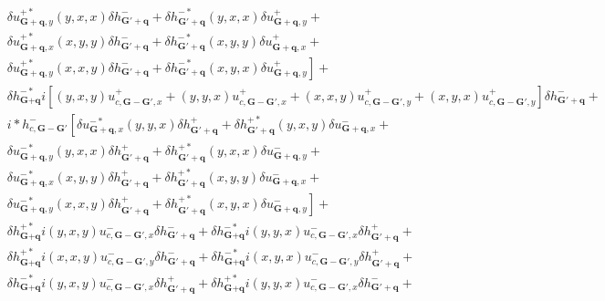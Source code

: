 \documentclass[aps,prx,10pt,twocolumn,superscriptaddress]{revtex4}
\begin{document}
\begin{widetext}
\begin{align}
&\delta u^{+*}_{\textbf{G}+\textbf{q},y}(y,x,x)\delta h^{-}_{\textbf{G}'+\textbf{q}} +\delta h^{-*}_{\textbf{G}'+\textbf{q}}(y,x,x)\delta u^{+}_{\textbf{G}+\textbf{q},y}+\nonumber\\
&\delta u^{+*}_{\textbf{G}+\textbf{q},x}(x,y,y)\delta h^{-}_{\textbf{G}'+\textbf{q}} +\delta h^{-*}_{\textbf{G}'+\textbf{q}}(x,y,y)\delta u^{+}_{\textbf{G}+\textbf{q},x}+\nonumber\\
&\left.\delta u^{+*}_{\textbf{G}+\textbf{q},y}(x,x,y)\delta h^{-}_{\textbf{G}'+\textbf{q}} +\delta h^{-*}_{\textbf{G}'+\textbf{q}}(x,y,x)\delta u^{+}_{\textbf{G}+\textbf{q},y}\right]+\nonumber\\
&\delta h^{-*}_{\textbf{G}+\textbf{q}}i\left[(y,x,y)u^{+}_{c,\textbf{G}-\textbf{G}',x}+(y,y,x)u^{+}_{c,\textbf{G}-\textbf{G}',x}+(x,x,y)u^{+}_{c,\textbf{G}-\textbf{G}',y}+(x,y,x)u^{+}_{c,\textbf{G}-\textbf{G}',y}\right]\delta h^{-}_{\textbf{G}'+\textbf{q}}+\nonumber\\
&i*h^{-}_{c,\textbf{G}-\textbf{G}'}\left[ \delta u^{-*}_{\textbf{G}+\textbf{q},x}(y,y,x)\delta h^{+}_{\textbf{G}'+\textbf{q}} +\delta h^{+*}_{\textbf{G}'+\textbf{q}}(y,x,y)\delta u^{-}_{\textbf{G}+\textbf{q},x}+ \right.\nonumber\\
&\delta u^{-*}_{\textbf{G}+\textbf{q},y}(y,x,x)\delta h^{+}_{\textbf{G}'+\textbf{q}} +\delta h^{+*}_{\textbf{G}'+\textbf{q}}(y,x,x)\delta u^{-}_{\textbf{G}+\textbf{q},y}+\nonumber\\
&\delta u^{-*}_{\textbf{G}+\textbf{q},x}(x,y,y)\delta h^{+}_{\textbf{G}'+\textbf{q}} +\delta h^{+*}_{\textbf{G}'+\textbf{q}}(x,y,y)\delta u^{-}_{\textbf{G}+\textbf{q},x}+\nonumber\\
&\left.\delta u^{-*}_{\textbf{G}+\textbf{q},y}(x,x,y)\delta h^{+}_{\textbf{G}'+\textbf{q}} +\delta h^{+*}_{\textbf{G}'+\textbf{q}}(x,y,x)\delta u^{-}_{\textbf{G}+\textbf{q},y}\right]+\nonumber\\
&\delta h^{+*}_{\textbf{G}+\textbf{q}}i(y,x,y)u^{-}_{c,\textbf{G}-\textbf{G}',x}\delta h^{-}_{\textbf{G}'+\textbf{q}}+\delta h^{-*}_{\textbf{G}+\textbf{q}}i(y,y,x)u^{-}_{c,\textbf{G}-\textbf{G}',x}\delta h^{+}_{\textbf{G}'+\textbf{q}}+\nonumber\\
&\delta h^{+*}_{\textbf{G}+\textbf{q}}i(x,x,y)u^{-}_{c,\textbf{G}-\textbf{G}',y}\delta h^{-}_{\textbf{G}'+\textbf{q}}+\delta h^{-*}_{\textbf{G}+\textbf{q}}i(x,y,x)u^{-}_{c,\textbf{G}-\textbf{G}',y}\delta h^{+}_{\textbf{G}'+\textbf{q}}+\nonumber\\
&\delta h^{-*}_{\textbf{G}+\textbf{q}}i(y,x,y)u^{-}_{c,\textbf{G}-\textbf{G}',x}\delta h^{+}_{\textbf{G}'+\textbf{q}}+\delta h^{+*}_{\textbf{G}+\textbf{q}}i(y,y,x)u^{-}_{c,\textbf{G}-\textbf{G}',x}\delta h^{-}_{\textbf{G}'+\textbf{q}}+\nonumber\\

\end{align}
\end{widetext}
\end{document}

